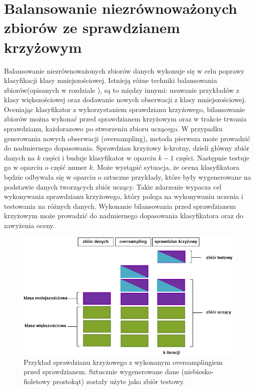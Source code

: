\section{Balansowanie niezrównoważonych zbiorów ze sprawdzianem krzyżowym}
\label{rozdzialbalansowanie}
Balansowanie niezrównoważonych zbiorów danych wykonuje się w celu poprawy klasyfikacji klasy mniejszościowej. Istnieją różne techniki balansowania zbiorów(opisanych w rozdziale ), są to między innymi: usuwanie przykładów z klasy większościowej oraz dodawanie nowych obserwacji z klasy mniejszościowej. Oceniając klasyfikator z wykorzystaniem sprawdzianu krzyżowego, bilansowanie zbiorów można wykonać przed sprawdzianem krzyżowym oraz w trakcie trwania sprawdzianu, każdorazowo po stworzeniu zbioru uczącego. W przypadku generowania nowych obserwacji (oversampling), metoda pierwsza może prowadzić do nadmiernego dopasowania. Sprawdzian krzyżowy k-krotny, dzieli główny zbiór danych na $k$ części i buduje klasyfikator w oparciu $k-1$ części. Następnie testuje go w oparciu o część numer $k$. Może wystąpić sytuacja, że ocena klasyfikatora będzie odbywała się w oparciu o sztuczne przykłady, które były wygenerowane na podstawie danych tworzących zbiór uczący. Takie zdarzenie wypacza cel wykonywania sprawdzianu krzyżowego, który polega na wykonywaniu uczenia i testowania na różnych danych. Wykonanie bilansowania przed sprawdzianem krzyżowym może prowadzić do nadmiernego dopasowania klasyfikatora oraz do zawyżenia oceny. 
\begin{figure}[H]
	\centering
	\includegraphics[width=\textwidth]{./images/oversampling.png}
	\caption{Przykład sprawdzianu krzyżowego z wykonanym oversamplingiem przed sprawdzianem. Sztucznie wygenerowane dane (niebiesko-fioletowy prostokąt) zostały użyte jako zbiór testowy.}
	\label{fig:oversampling_wrong}
\end{figure}
